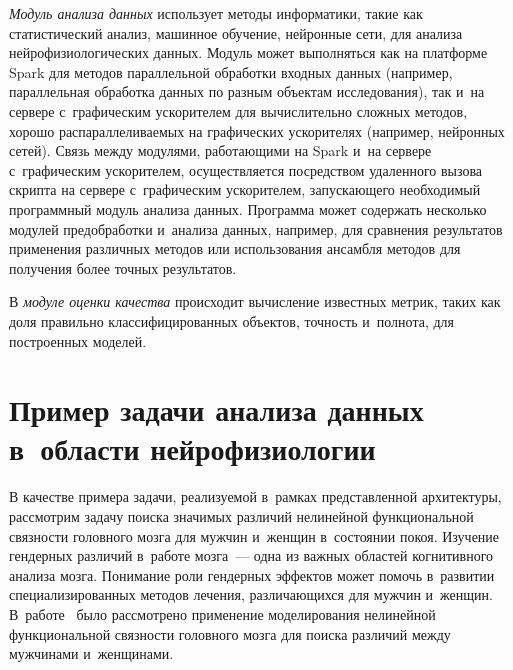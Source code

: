 \begin{multicols}{2}
    \textit{Модуль анализа данных} использует методы информатики, такие 
как статистический анализ, машинное обучение, нейронные сети, для анализа 
нейрофизиологических данных. Модуль может выполняться как на 
платформе Spark для методов параллельной обработки входных данных 
(например, параллельная обработка данных по разным объектам 
исследования), так и~на сервере с~графическим ускорителем для 
вычислительно сложных методов, хорошо распараллеливаемых на 
графических ускорителях (например, нейронных сетей). Связь между 
модулями, работающими на Spark и~на сервере с~графическим ускорителем, 
осуществляется посредством удаленного вызова скрипта на сервере 
с~графическим ускорителем, запускающего необходимый программный 
модуль анализа данных. Программа может содержать несколько модулей 
предобработки и~анализа данных, например, для сравнения результатов 
применения различных методов или использования ансамбля методов для 
получения более точных результатов. 
    
    В \textit{модуле оценки качества} происходит вычисление известных 
метрик, таких как доля правильно классифицированных объектов, точ\-ность 
и~полнота, для построенных моделей.

\section{Пример задачи анализа данных в~области  
нейрофизиологии}

    В качестве примера задачи, реализуемой в~рамках представленной 
архитектуры, рассмотрим задачу поиска значимых различий нелинейной 
функциональной связности головного мозга для мужчин и~женщин 
в~состоянии покоя. Изучение гендерных различий в~работе мозга~--- одна из 
важных областей когнитивного анализа мозга. Понимание роли гендерных 
эффектов может помочь в~развитии специализированных методов лечения, 
раз\-ли\-ча\-ющих\-ся для мужчин и~женщин. В~работе~\cite{7-st} было 
рассмотрено применение моделирования нелинейной функциональной 
связности головного мозга для поиска различий между мужчинами 
и~женщинами. 

\begin{figure*} %
\vspace*{1pt}
 \begin{center}
 \mbox{%
 \epsfxsize=149.855mm  
 }
  \end{center}
\vspace*{-9pt}
\end{figure*}


\end{multicols}
